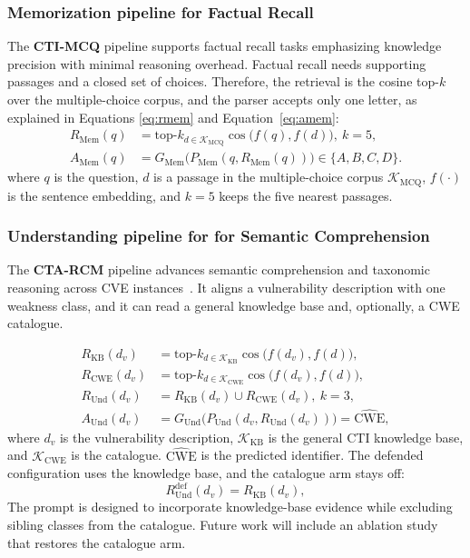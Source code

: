 \documentclass[5p,times,authoryear]{elsarticle}
\begin{document}
\subsubsection{Memorization pipeline for Factual Recall}
The \textbf{CTI-MCQ} pipeline supports factual recall tasks emphasizing knowledge precision with minimal reasoning overhead. Factual recall needs supporting passages and a closed set of choices.  Therefore, the retrieval is the cosine top-$k$ over the multiple-choice corpus, and the parser accepts only one letter, as explained in Equations \eqref{eq:rmem} and Equation~\eqref{eq:amem}:
\begin{align}
R_{\mathrm{Mem}}(q)&=\mathrm{top}\text{-}k_{d\in\mathcal{K}_{\mathrm{MCQ}}}\cos\!\bigl(f(q),f(d)\bigr),\ k{=}5,\label{eq:rmem}\\
A_{\mathrm{Mem}}(q)&=G_{\mathrm{Mem}}\!\bigl(P_{\mathrm{Mem}}(q,R_{\mathrm{Mem}}(q))\bigr)\in\{A,B,C,D\}.\label{eq:amem}
\end{align}
where $q$ is the question, $d$ is a passage in the multiple-choice corpus $\mathcal{K}_{\mathrm{MCQ}}$, $f(\cdot)$ is the sentence embedding, and $k{=}5$ keeps the five nearest passages. 


\subsubsection{Understanding pipeline for for Semantic Comprehension }
The \textbf{CTA-RCM} pipeline advances semantic comprehension and taxonomic reasoning across CVE instances~\cite{liu2024threatkg}. It aligns a vulnerability description with one weakness class, and it can read a general knowledge base and, optionally, a CWE catalogue. 


\begin{align}
R_{\mathrm{KB}}(d_v)&=\mathrm{top}\text{-}k_{d\in\mathcal{K}_{\mathrm{KB}}}\cos\!\bigl(f(d_v),f(d)\bigr),\label{eq:rkb}\\
R_{\mathrm{CWE}}(d_v)&=\mathrm{top}\text{-}k_{d\in\mathcal{K}_{\mathrm{CWE}}}\cos\!\bigl(f(d_v),f(d)\bigr),\label{eq:rcwe}\\
R_{\mathrm{Und}}(d_v)&=R_{\mathrm{KB}}(d_v)\cup R_{\mathrm{CWE}}(d_v),\ k{=}3,\label{eq:rund}\\
A_{\mathrm{Und}}(d_v)&=G_{\mathrm{Und}}\!\bigl(P_{\mathrm{Und}}(d_v,R_{\mathrm{Und}}(d_v))\bigr)=\widehat{\mathrm{CWE}},\label{eq:aund}
\end{align}
where $d_v$ is the vulnerability description, $\mathcal{K}_{\mathrm{KB}}$ is the general CTI knowledge base, and $\mathcal{K}_{\mathrm{CWE}}$ is the catalogue. $\widehat{\mathrm{CWE}}$ is the predicted identifier. The defended configuration uses the knowledge base, and the catalogue arm stays off:
\begin{equation}
R_{\mathrm{Und}}^{\mathrm{def}}(d_v)=R_{\mathrm{KB}}(d_v),
\label{eq:rund-def}
\end{equation}
The prompt is designed to incorporate knowledge-base evidence while excluding sibling classes from the catalogue. Future work will include an ablation study that restores the catalogue arm.
\end{document}
